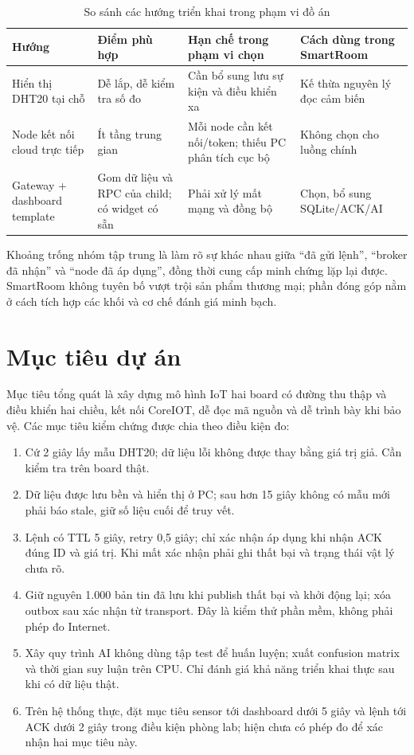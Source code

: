 \begin{table}[H]\centering\small
\caption{So sánh các hướng triển khai trong phạm vi đồ án}
\begin{tabular}{P{3cm}P{4.2cm}P{3.8cm}P{3.6cm}}
\toprule Hướng & Điểm phù hợp & Hạn chế trong phạm vi chọn & Cách dùng trong SmartRoom \\ \midrule
Hiển thị DHT20 tại chỗ & Dễ lắp, dễ kiểm tra số đo & Cần bổ sung lưu sự kiện và điều khiển xa & Kế thừa nguyên lý đọc cảm biến \\
Node kết nối cloud trực tiếp & Ít tầng trung gian & Mỗi node cần kết nối/token; thiếu PC phân tích cục bộ & Không chọn cho luồng chính \\
Gateway + dashboard template & Gom dữ liệu và RPC của child; có widget có sẵn & Phải xử lý mất mạng và đồng bộ & Chọn, bổ sung SQLite/ACK/AI \\
\bottomrule
\end{tabular}
\end{table}

Khoảng trống nhóm tập trung là làm rõ sự khác nhau giữa ``đã gửi lệnh'', ``broker đã nhận'' và ``node đã áp dụng'', đồng thời cung cấp minh chứng lặp lại được. SmartRoom không tuyên bố vượt trội sản phẩm thương mại; phần đóng góp nằm ở cách tích hợp các khối và cơ chế đánh giá minh bạch.

\section{Mục tiêu dự án}
Mục tiêu tổng quát là xây dựng mô hình IoT hai board có đường thu thập và điều khiển hai chiều, kết nối CoreIOT, dễ đọc mã nguồn và dễ trình bày khi bảo vệ. Các mục tiêu kiểm chứng được chia theo điều kiện đo:
\begin{enumerate}
\item Cứ 2 giây lấy mẫu DHT20; dữ liệu lỗi không được thay bằng giá trị giả. Cần kiểm tra trên board thật.
\item Dữ liệu được lưu bền và hiển thị ở PC; sau hơn 15 giây không có mẫu mới phải báo stale, giữ số liệu cuối để truy vết.
\item Lệnh có TTL 5 giây, retry 0,5 giây; chỉ xác nhận áp dụng khi nhận ACK đúng ID và giá trị. Khi mất xác nhận phải ghi thất bại và trạng thái vật lý chưa rõ.
\item Giữ nguyên 1.000 bản tin đã lưu khi publish thất bại và khởi động lại; xóa outbox sau xác nhận từ transport. Đây là kiểm thử phần mềm, không phải phép đo Internet.
\item Xây quy trình AI không dùng tập test để huấn luyện; xuất confusion matrix và thời gian suy luận trên CPU. Chỉ đánh giá khả năng triển khai thực sau khi có dữ liệu thật.
\item Trên hệ thống thực, đặt mục tiêu sensor tới dashboard dưới 5 giây và lệnh tới ACK dưới 2 giây trong điều kiện phòng lab; hiện chưa có phép đo để xác nhận hai mục tiêu này.
\end{enumerate}

